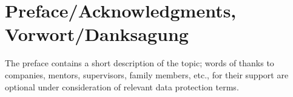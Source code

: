 \chapter{Preface/Acknowledgments, Vorwort/Danksagung}
The preface contains a short description of the topic; words of thanks to companies, mentors, supervisors, family members, etc., for their support are optional under consideration of relevant data protection terms.
